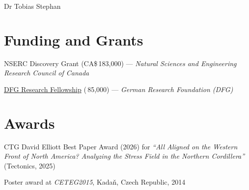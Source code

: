 \documentclass[10pt, paper=letter]{scrartcl} %
\begin{document}
\begin{cv}{\textcolor{myred}{\textsf{Dr Tobias Stephan}}}
    \section{Funding and Grants}
    \begin{cvlist}{}
        \item[2026--2031] NSERC Discovery Grant (CA\$\,183,000) --- \textit{Natural Sciences and Engineering Research Council of Canada}
        \item[2020--2022]
        \href{https://gepris.dfg.de/gepris/projekt/439621066?language=en}{DFG Research
            Fellowship} (\texteuro\,85,000) --- \textit{German Research Foundation (DFG)}
    \end{cvlist}

    \section{Awards}
    \begin{cvlist}{}
        \item[2026] CTG David Elliott Best Paper Award (2026) for \textit{\enquote{All Aligned on the Western Front of North America? Analyzing the Stress Field in the Northern Cordillera}} (Tectonics, 2025)
        \item[2014] Poster award at \textit{CETEG2015}, Kada\v{n}, Czech Republic, 2014
    \end{cvlist}
    

\end{cv}
\end{document}
